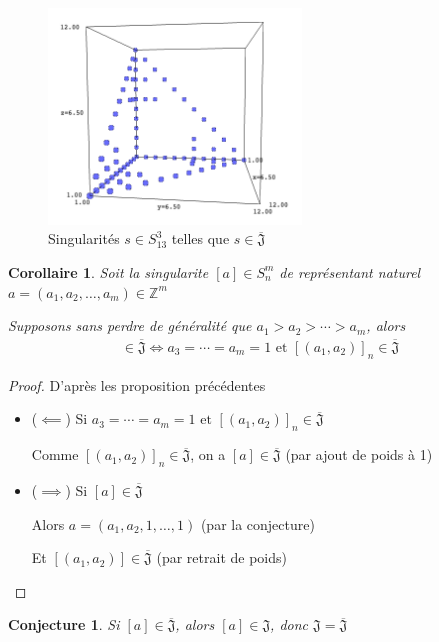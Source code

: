 \documentclass{article}
\newtheorem{conjecture}{Conjecture}
\newtheorem{corollary}{Corollaire}
\begin{document}
\begin{figure}[h]
    \caption{Singularités $s \in S_{13}^3$ telles que $s \in \overline{\mathfrak{J}}$}
    \centering
    \includegraphics[width=0.6\textwidth]{singularite_j_strict_m3_n13}
\end{figure}

\begin{corollary}
    Soit la singularite $[a] \in S_n^m$ de représentant naturel $a = (a_1, a_2, \dots, a_m) \in \mathbb{Z}^m$

    Supposons sans perdre de généralité que $a_1 > a_2 > \cdots > a_m$, alors
    \begin{align*}
        [a] \in \overline{\mathfrak{J}} \iff a_3 = \cdots = a_m = 1 \text{ et } {[(a_1, a_2)]}_n \in \overline{\mathfrak{J}}
    \end{align*}
\end{corollary}

\begin{proof} D'après les proposition précédentes
    \begin{itemize}
        \item ($\impliedby$) Si $a_3 = \cdots = a_m = 1 \text{ et } {[(a_1, a_2)]}_n \in \overline{\mathfrak{J}}$
        
            Comme ${[(a_1, a_2)]}_n \in \overline{\mathfrak{J}}$, on a $[a] \in \overline{\mathfrak{J}}$ (par ajout de poids à 1)
        \item ($\implies$) Si $[a] \in \overline{\mathfrak{J}}$

            Alors $a = (a_1, a_2, 1, \dots, 1)$  (par la conjecture)

            Et $[(a_1, a_2)] \in \overline{\mathfrak{J}}$ (par retrait de poids)
    \end{itemize}
\end{proof}

\begin{conjecture}
    Si $[a] \in \overline{\mathfrak{J}}$, alors $[a] \in \mathfrak{J}$, donc $\mathfrak{J} = \overline{\mathfrak{J}}$
\end{conjecture}
\end{document}
